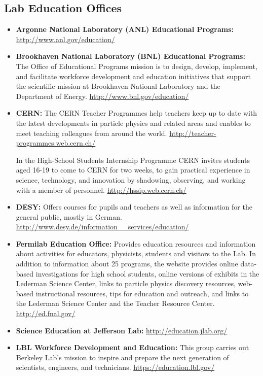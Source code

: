 \subsection{Lab Education Offices}\label{lab-education-offices}

\begin{itemize}
\item
  \textbf{Argonne National Laboratory (ANL) Educational Programs:}
  \url{http://www.anl.gov/education/}
\item
  \textbf{Brookhaven National Laboratory (BNL) Educational Programs:}
  The Office of Educational Programs mission is to design, develop,
  implement, and facilitate workforce development and education
  initiatives that support the scientific mission at Brookhaven National
  Laboratory and the Department of Energy.
  \url{http://www.bnl.gov/education/}
\item
  \textbf{CERN:} The CERN Teacher Programmes help teachers keep up to
  date with the latest developments in particle physics and related
  areas and enables to meet teaching colleagues from around the world.
  \url{http://teacher-programmes.web.cern.ch/}

  In the High-School Students Internship Programme CERN invites students
  aged 16-19 to come to CERN for two weeks, to gain practical experience
  in science, technology, and innovation by shadowing, observing, and
  working with a member of personnel. \url{http://hssip.web.cern.ch/}
\item
  \textbf{DESY:} Offers courses for pupils and teachers as well as
  information for the general public, mostly in German.
  \url{http://www.desy.de/information__services/education/}
\item
  \textbf{Fermilab Education Office:} Provides education resources and
  information about activities for educators, physicists, students and
  visitors to the Lab. In addition to information about 25 programs, the
  website provides online data-based investigations for high school
  students, online versions of exhibits in the Lederman Science Center,
  links to particle physics discovery resources, web-based instructional
  resources, tips for education and outreach, and links to the Lederman
  Science Center and the Teacher Resource Center.
  \url{http://ed.fnal.gov/}
\item
  \textbf{Science Education at Jefferson Lab:}
  \url{http://education.jlab.org/}
\item
  \textbf{LBL Workforce Development and Education:} This group carries
  out Berkeley Lab's mission to inspire and prepare the next generation
  of scientists, engineers, and technicians.
  \url{https://education.lbl.gov/}
\end{itemize}

